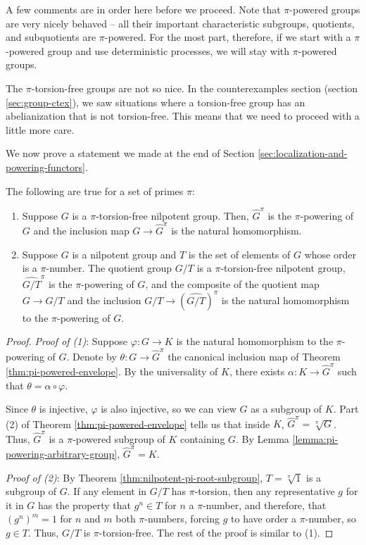 \documentclass{ucetd}
\begin{document}
A few comments are in order here before we proceed. Note that
$\pi$-powered groups are very nicely behaved -- all their important
characteristic subgroups, quotients, and subquotients are
$\pi$-powered. For the most part, therefore, if we start with a
$\pi$-powered group and use deterministic processes, we will stay with
$\pi$-powered groups.

The $\pi$-torsion-free groups are not so nice. In the counterexamples
section (section \ref{sec:group-ctex}), we saw situations where a
torsion-free group has an abelianization that is not
torsion-free. This means that we need to proceed with a little more
care.

We now prove a statement we made at the end of Section
\ref{sec:localization-and-powering-functors}.

\begin{theorem}
  The following are true for a set of primes $\pi$:

  \begin{enumerate}
  \item Suppose $G$ is a $\pi$-torsion-free nilpotent group. Then,
    $\hat{G}^\pi$ is the $\pi$-powering of $G$ and the inclusion map
    $G \to \hat{G}^\pi$ is the natural homomorphism.
  \item Suppose $G$ is a nilpotent group and $T$ is the set of
    elements of $G$ whose order is a $\pi$-number. The quotient group
    $G/T$ is a $\pi$-torsion-free nilpotent group, $\hat{G/T}^\pi$ is
    the $\pi$-powering of $G$, and the composite of the quotient map $G
    \to G/T$ and the inclusion $G/T \to (\hat{G/T})^\pi$ is the
    natural homomorphism to the $\pi$-powering of $G$.
  \end{enumerate}
\end{theorem}

\begin{proof}
  {\em Proof of (1)}: Suppose $\varphi:G \to K$ is the natural
  homomorphism to the $\pi$-powering of $G$. Denote by $\theta: G \to
  \hat{G}^\pi$ the canonical inclusion map of Theorem
  \ref{thm:pi-powered-envelope}. By the universality of $K$, there exists
  $\alpha:K \to \hat{G}^\pi$ such that $\theta = \alpha \circ
  \varphi$.

  Since $\theta$ is injective, $\varphi$ is also injective, so we can
  view $G$ as a subgroup of $K$. Part (2) of Theorem
  \ref{thm:pi-powered-envelope} tells us that inside $K$, $\hat{G}^\pi =
  \sqrt[\pi]{G}$. Thus, $\hat{G}^\pi$ is a $\pi$-powered subgroup of
  $K$ containing $G$. By Lemma
  \ref{lemma:pi-powering-arbitrary-group}, $\hat{G}^\pi = K$.

  {\em Proof of (2)}: By Theorem \ref{thm:nilpotent-pi-root-subgroup}, $T
  = \sqrt[\pi]{1}$ is a subgroup of $G$. If any element in $G/T$ has
  $\pi$-torsion, then any representative $g$ for it in $G$ has the
  property that $g^n \in T$ for $n$ a $\pi$-number, and therefore,
  that $(g^n)^m = 1$ for $n$ and $m$ both $\pi$-numbers, forcing $g$
  to have order a $\pi$-number, so $g \in T$. Thus, $G/T$ is
  $\pi$-torsion-free. The rest of the proof is similar to (1).
\end{proof}
\end{document}

